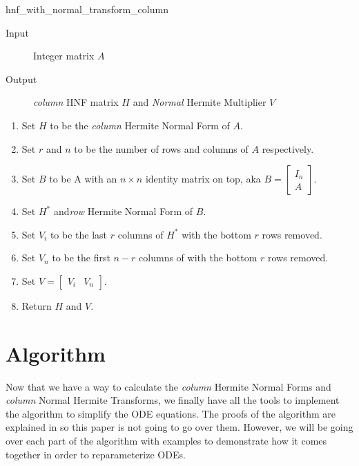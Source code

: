 \documentclass[oneside, a4paper, onecolumn, 11pt]{article}
\begin{document}
\begin{algorithm}[H]
    \caption{hnf\_with\_normal\_transform\_column}

    \begin{description}
        \item[Input] Integer matrix \(A\)
        \item[Output] \textit{column} HNF matrix \(H\) and \textit{Normal} Hermite Multiplier \(V\)
    \end{description}

    \begin{enumerate}[label = \textbf{(Step~\arabic*)}, leftmargin=*, align=left, labelsep=2pt, itemsep=0pt]
        \item Set \(H\) to be the \textit{column} Hermite Normal Form of \(A\).
        \item Set \(r\) and \(n\) to be the number of rows and columns of \(A\) respectively.
        \item Set \(B\) to be A with an \(n \times n\) identity matrix on top, aka \(B = \begin{bmatrix} I_n \\ A \end{bmatrix}\).
        \item Set \(H^*\) and\textit{row} Hermite Normal Form of \(B\).
        \item Set \(V_i\) to be the last \(r\) columns of \(H^*\) with the bottom \(r\) rows removed.
        \item Set \(V_n\) to be the first \(n - r\) columns of with the bottom \(r\) rows removed.
        \item Set \(V = \begin{bmatrix} V_i & V_n \end{bmatrix}\).
        \item Return \(H\) and \(V\).
    \end{enumerate}
\end{algorithm}

\section{Algorithm}

Now that we have a way to calculate the \textit{column} Hermite Normal Forms and \textit{column} Normal Hermite Transforms, we finally have all the tools to implement the algorithm to simplify the ODE equations. The proofs of the algorithm are explained in \cite{Hubert2013} so this paper is not going to go over them. However, we will be going over each part of the algorithm with examples to demonstrate how it comes together in order to reparameterize ODEs.
\end{document}
